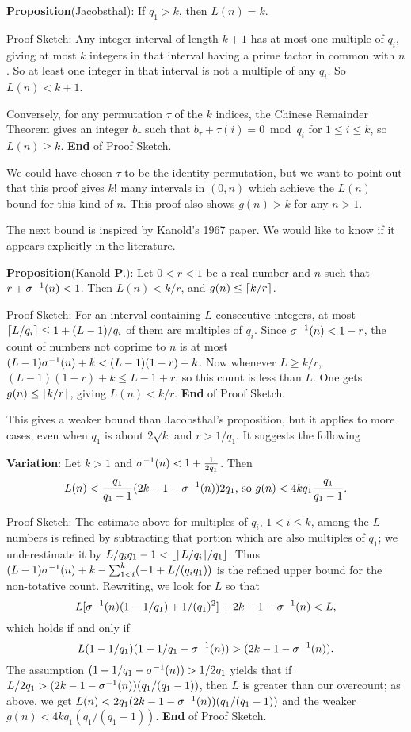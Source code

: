 \documentclass[12pt,leqno]{article}
\begin{document}
\textbf{Proposition}(Jacobsthal):    If $q_1 \gt k$, then $L(n)=k$.

Proof Sketch:  Any integer interval of length $k+1$ has at 
most one multiple of $q_i$, giving at most $k$ integers in 
that interval having a prime factor in common with $n$.  
So at least one integer in that interval is not a 
multiple of any $q_i$. So $L(n) \lt k+1$.

Conversely, for any permutation $\tau$ of the $k$ indices, 
the Chinese Remainder Theorem gives an integer $b_\tau$
 such that $b_\tau + \tau(i) = 0 \bmod{q_i}$ for
$1 \leq i \leq k$, so $L(n) \geq k$.  \textbf{End} of Proof Sketch.

We could have chosen $\tau$ to be the identity permutation, but
we want to point out that this proof gives $k!$ many intervals 
in $(0,n)$ which achieve the $L(n)$ bound for this kind of $n$.
This proof also shows $g(n) \gt k$ for any $n \gt 1$.  

The next bound is inspired by Kanold's 1967 paper.  We would like to
know if it appears explicitly in the literature.

\textbf{Proposition}(Kanold-\textbf{P}.): Let $0 \lt r \lt 1$ be a real number 
and $n$ such that $r + {\sigma}^{-1}(n) < 1$.  Then 
$L(n) \lt k/r$, and $g(n) \leq \lceil k/r \rceil$. 

Proof Sketch:  For an interval containing $L$ consecutive 
integers, at most $\lceil L/q_i \rceil \leq 1 + (L-1)/q_i$ of 
them are multiples of $q_i$.  Since ${\sigma}^{-1}(n) < 1-r$, 
 the count of numbers not coprime to $n$ is at most 
$(L-1){\sigma}^{-1}(n) + k < (L-1)(1-r) +k$.  Now whenever $L \geq k/r$,  
$(L-1)(1-r) + k \leq L -1 + r$, so this count is less than $L$. 
One gets $g(n) \leq \lceil k/r \rceil$, 
giving $L(n) \lt k/r$.  \textbf{End} of Proof Sketch.

This gives a weaker bound than Jacobsthal's proposition, but
it applies to more cases, even when $q_1$ is about $2\sqrt{k}$
and $r \gt 1/q_1$.  It suggests the following

\textbf{Variation}: Let $k \gt 1$ and ${\sigma}^{-1}(n) < 1 + \frac{1}{2q_1}$. Then 
$$L(n) < \frac{q_1}{q_1-1}(2k -1 - {\sigma}^{-1}(n))2q_1 \textrm{, so } 
g(n) < 4kq_1\frac{q_1}{q_1-1}.$$

Proof Sketch:  The estimate above for multiples of $q_i$,
$1 \lt i \leq k$, among the $L$ numbers is refined by subtracting that  
portion which are also multiples of $q_1$; we
underestimate it by 
$L/q_iq_1 - 1 < \lfloor \lceil L/q_i \rceil/q_1 \rfloor$.
Thus $(L-1){\sigma}^{-1}(n) + k - \sum_{1 < i}^k (-1 + L/(q_iq_1))$ is the
refined
upper bound for the non-totative count.  Rewriting, we look for $L$ so that 
\begin{displaymath}
L[{\sigma}^{-1}(n)(1- 1/q_1) + 1/(q_1)^2] + 2k-1 - {\sigma}^{-1}(n) < L,
\end{displaymath}
which holds if and only if 
$$L(1 - 1/q_1)(1 + 1/q_1 - {\sigma}^{-1}(n)) > (2k - 1 -{\sigma}^{-1}(n)).$$
The assumption $(1 +1/q_1 - {\sigma}^{-1}(n)) > 1/2q_1$ yields that
if $L/2q_1 > (2k - 1 - {\sigma}^{-1}(n))(q_1/(q_1 -1))$, then
$L$ is greater than our overcount; as above, we get
$L(n) < 2q_1 (2k - 1 - {\sigma}^{-1}(n))(q_1/(q_1 - 1))$ 
and the weaker $g(n) \lt 4kq_1(q_1/(q_1 -1))$.  \textbf{End} of Proof Sketch.
\end{document}
